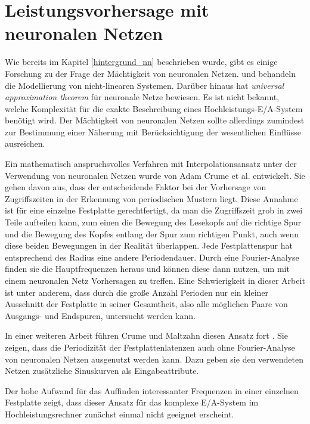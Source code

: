\documentclass[
	12pt,
	a4paper,
	BCOR10mm,
	DIV14,
	listof=totoc,
	bibliography=totoc,
	headsepline
]{scrreprt}
\begin{document}
\section{Leistungsvorhersage mit neuronalen Netzen}
\label{rel_vorhersage-mit-nn}
Wie bereits im Kapitel \ref{hintergrund_nn} beschrieben wurde, gibt es einige Forschung zu der Frage der Mächtigkeit von neuronalen Netzen. \cite{Rojas:1996:NNS:235222} und \cite{cybenko:mcss} behandeln die Modellierung von nicht-linearen Systemen. Darüber hinaus \cite{suykens2012artificial} hat \textit{universal approximation theorem} für neuronale Netze bewiesen. Es ist nicht bekannt, welche Komplexität für die exakte Beschreibung eines Hochleistungs-E/A-System benötigt wird. Der Mächtigkeit von neuronalen Netzen sollte allerdings zumindest zur Bestimmung einer Näherung mit Berücksichtigung der wesentlichen Einflüsse ausreichen.

Ein mathematisch anspruchsvolles Verfahren mit Interpolationsansatz unter der Verwendung von neuronalen Netzen wurde von Adam Crume et al. \cite{Crume:2013:FML:2538542.2538561} entwickelt. Sie gehen davon aus, dass der entscheidende Faktor bei der Vorhersage von Zugriffszeiten in der Erkennung von periodischen Mustern liegt. Diese Annahme ist für eine einzelne Festplatte gerechtfertigt, da man die Zugriffszeit grob in zwei Teile aufteilen kann, zum einen die Bewegung des Lesekopfs auf die richtige Spur und die Bewegung des Kopfes entlang der Spur zum richtigen Punkt, auch wenn diese beiden Bewegungen in der Realität überlappen. Jede Festplattenspur hat entsprechend des Radius eine andere Periodendauer.
Durch eine Fourier-Analyse finden sie die Hauptfrequenzen heraus und können diese dann nutzen, um mit einem neuronalen Netz Vorhersagen zu treffen.
Eine Schwierigkeit in dieser Arbeit ist unter anderem, dass durch die große Anzahl Perioden nur ein kleiner Ausschnitt der Festplatte in seiner Gesamtheit, also alle möglichen Paare von Ausgangs- und Endspuren, untersucht werden kann.

In einer weiteren Arbeit führen Crume und Maltzahn diesen Ansatz fort \cite{crumeadammaltzahncarlos2015}. Sie zeigen, dass die Periodizität der Festplattenlatenzen auch ohne Fourier-Analyse von neuronalen Netzen ausgenutzt werden kann. Dazu geben sie den verwendeten Netzen zusätzliche Sinuskurven als Eingabeattribute.

Der hohe Aufwand für das Auffinden interessanter Frequenzen in einer einzelnen Festplatte zeigt, dass dieser Ansatz für das komplexe E/A-System im Hochleistungsrechner zunächst einmal nicht geeignet erscheint.
\end{document}
